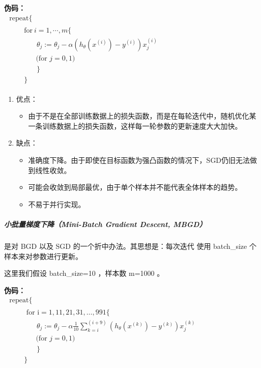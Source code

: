 \noindent \textbf{伪码：}\\
$\begin{array}{l}{\text { repeat\{ }}\\ {\qquad \begin{array}{l}{\text{for}~i=1,\cdots,m\{}\\{~~~~~~~~\theta_{j}:=\theta_{j}-\alpha \left(h_{\theta}\left(x^{(i)}\right)-y^{(i)}\right) x_{j}^{(i)}} \\ { ~~~~~~\text { (for }j=0,1)} \\ ~~~~~~~~\} \\ \} \end{array}}\end{array}$

\begin{enumerate}
  \item 优点：
\begin{itemize}
  \item 由于不是在全部训练数据上的损失函数，而是在每轮迭代中，随机优化某一条训练数据上的损失函数，这样每一轮参数的更新速度大大加快。
\end{itemize}
  \item 缺点：
\begin{itemize}
  \item 准确度下降。由于即使在目标函数为强凸函数的情况下，SGD仍旧无法做到线性收敛。
  \item 可能会收敛到局部最优，由于单个样本并不能代表全体样本的趋势。
  \item 不易于并行实现。
\end{itemize}
\end{enumerate}

\subparagraph{小批量梯度下降（Mini-Batch Gradient Descent, MBGD）}

是对 BGD 以及 SGD 的一个折中办法。其思想是：每次迭代 使用 batch\_size 个样本来对参数进行更新。

这里我们假设 batch\_size=10 ，样本数 m=1000 。

\noindent \textbf{伪码：}\\
$\begin{array}{l}{\text { repeat\{ }}\\ {\qquad \begin{array}{l}{\text { for } \mathrm{i}=1,11,21,31, \ldots, 991 \{}\\{~~~~~~~~\theta_{j}:=\theta_{j}-\alpha \frac{1}{10} \sum_{k=i}^{(i+9)}\left(h_{\theta}\left(x^{(k)}\right)-y^{(k)}\right) x_{j}^{(k)}} \\ { ~~~~~~\text { (for }j=0,1)} \\ ~~~~~~~~\} \\ \} \end{array}}\end{array}$


